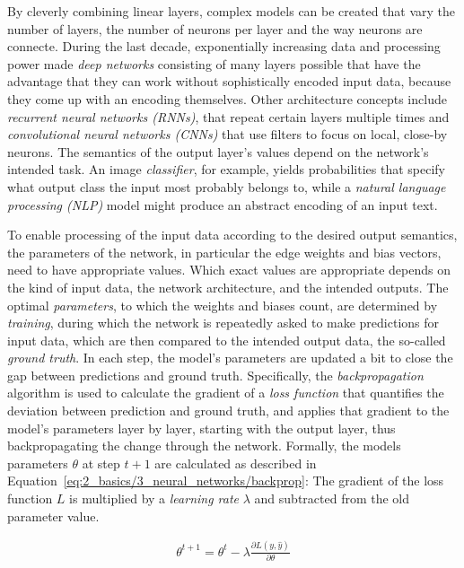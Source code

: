 By cleverly combining linear layers, complex models can be created that vary the number of layers, the number of neurons per layer and the way neurons are connecte. During the last decade, exponentially increasing data and processing power made \emph{deep networks} consisting of many layers possible that have the advantage that they can work without sophistically encoded input data, because they come up with an encoding themselves. Other architecture concepts include \emph{recurrent neural networks (RNNs)}, that repeat certain layers multiple times and \emph{convolutional neural networks (CNNs)} that use filters to focus on local, close-by neurons. The semantics of the output layer's values depend on the network's intended task. An image \emph{classifier}, for example, yields probabilities that specify what output class the input most probably belongs to, while a \emph{natural language processing (NLP)} model might produce an abstract encoding of an input text.

To enable processing of the input data according to the desired output semantics, the parameters of the network, in particular the edge weights and bias vectors, need to have appropriate values. Which exact values are appropriate depends on the kind of input data, the network architecture, and the intended outputs. The optimal \emph{parameters}, to which the weights and biases count, are determined by \emph{training}, during which the network is repeatedly asked to make predictions for input data, which are then compared to the intended output data, the so-called \emph{ground truth}. In each step, the model's parameters are updated a bit to close the gap between predictions and ground truth. Specifically, the \emph{backpropagation} algorithm is used to calculate the gradient of a \emph{loss function} that quantifies the deviation between prediction and ground truth, and applies that gradient to the model's parameters layer by layer, starting with the output layer, thus backpropagating the change through the network. Formally, the models parameters $\theta$ at step $t+1$ are calculated as described in Equation~\ref{eq:2_basics/3_neural_networks/backprop}: The gradient of the loss function $L$ is multiplied by a \emph{learning rate} $\lambda$ and subtracted from the old parameter value.

\begin{align}
    \theta^{t+1} = \theta^t - \lambda \frac{\partial L(y, \hat{y})}{\partial \theta}
    \label{eq:2_basics/3_neural_networks/backprop}
\end{align}

